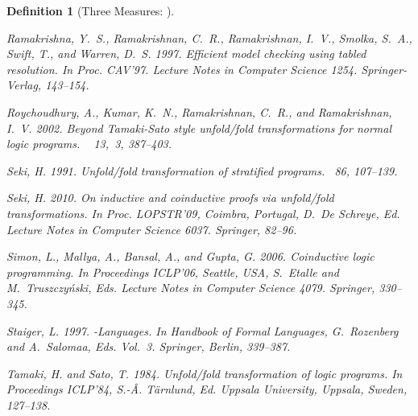 \documentclass[english]{tlp}
\newtheorem{definition}{Definition} \newtheorem{example}{Example}       \newtheorem{remark}{Remark}
\begin{document}
\begin{definition}[Three Measures:   ]
{\begin{thebibliography}{}
{\sc Ramakrishna, Y.~S.}, {\sc Ramakrishnan, C.~R.}, {\sc Ramakrishnan, I.~V.},
  {\sc Smolka, S.~A.}, {\sc Swift, T.}, {\sc and} {\sc Warren, D.~S.} 1997.
\newblock Efficient model checking using tabled resolution.
\newblock In {\em Proc. CAV'97}. Lecture Notes in Computer Science 1254.
  Springer-Verlag, 143--154.

{\sc Roychoudhury, A.}, {\sc Kumar, K.~N.}, {\sc Ramakrishnan, C.~R.}, {\sc
  and} {\sc Ramakrishnan, I.~V.} 2002.
\newblock Beyond {T}amaki-{S}ato style unfold/fold transformations for normal
  logic programs.
~{\em
  13,\/}~3, 387--403.

{\sc Seki, H.} 1991.
\newblock Unfold/fold trans\-form\-ation of stratified pro\-grams.
~{\em 86}, 107--139.

{\sc Seki, H.} 2010.
\newblock On inductive and coinductive proofs via unfold/fold transformations.
\newblock In {\em Proc. LOPSTR'09,
  Coimbra, Portugal}, {D.~{De Schreye}}, Ed.  
  Lecture Notes in Computer Science 6037. Springer, 82--96.

{\sc Simon, L.}, {\sc Mallya, A.}, {\sc Bansal, A.}, {\sc and} {\sc Gupta, G.}
  2006.
\newblock Coinductive logic programming.
\newblock In {\em Proceedings ICLP'06, Seattle, USA}, {S.~Etalle} {and}
  {M.~Truszczy\'{n}ski}, Eds. Lecture Notes in Computer Science 4079. Springer,
  330--345.

{\sc Staiger, L.} 1997.
\newblock -{L}anguages.
\newblock In {\em Handbook of Formal Languages}, {G.~Rozenberg} {and}
  {A.~Salomaa}, Eds. Vol.~3. Springer, Berlin, 339--387.

{\sc Tamaki, H.} {\sc and} {\sc Sato, T.} 1984.
\newblock Unfold/fold trans\-form\-ation of logic pro\-grams.
\newblock In {\em Proceedings ICLP'84}, {S.-{\AA}. T{{\"a}}rnlund}, 
Ed. Uppsala University,
  Uppsala, Sweden, 127--138.


\end{thebibliography}}
\end{definition}
\end{document}
